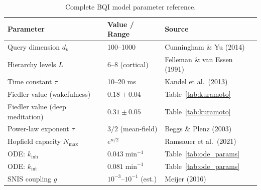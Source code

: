 \documentclass[12pt,a4paper]{article}
\theoremstyle{plain}
\theoremstyle{definition}
\theoremstyle{remark}
\begin{document}
\begin{table}[htbp]
\centering
\small
\caption{Complete BQI model parameter reference.}
\label{tab:params}
\renewcommand{\arraystretch}{1.2}
\begin{tabular}{lll}
\toprule
\rowcolor{hdrcol}
\color{white}\textbf{Parameter} & \color{white}\textbf{Value / Range} & \color{white}\textbf{Source} \\
\midrule
Query dimension $d_k$            & 100--1000                & Cunningham \& Yu (2014) \\
Hierarchy levels $L$             & 6--8 (cortical)          & Felleman \& van Essen (1991) \\
Time constant $\tau$             & 10--20 ms                & Kandel et al.\ (2013) \\
Fiedler value (wakefulness)      & $0.18\pm 0.04$           & Table~\ref{tab:kuramoto} \\
Fiedler value (deep meditation)  & $0.31\pm 0.05$           & Table~\ref{tab:kuramoto} \\
Power-law exponent $\tau$        & $3/2$ (mean-field)       & Beggs \& Plenz (2003) \\
Hopfield capacity $N_\mathrm{max}$& $e^{n/2}$               & Ramsauer et al.\ (2021) \\
ODE: $k_\mathrm{inh}$           & $0.043\;\mathrm{min}^{-1}$ & Table~\ref{tab:ode_params} \\
ODE: $k_\mathrm{int}$           & $0.081\;\mathrm{min}^{-1}$ & Table~\ref{tab:ode_params} \\
SNIS coupling $g$                & $10^{-3}$--$10^{-1}$ (est.) & Meijer (2016) \\
\bottomrule
\end{tabular}
\end{table}
\end{document}
